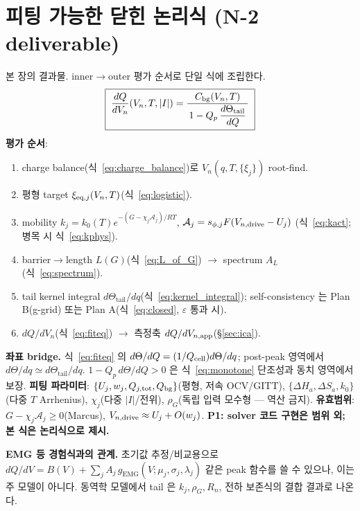 \section{피팅 가능한 닫힌 논리식 (N-2 deliverable)}\label{sec:fiteq}
본 장의 결과물. inner$\to$outer 평가 순서로 단일 식에 조립한다.
\begin{equation}
\boxed{\;\frac{dQ}{dV_n}(V_n,T,|I|)=\frac{C_{\mathrm{bg}}(V_n,T)}{\,1-Q_p\,\dfrac{d\Theta_\mathrm{tail}}{dQ}\,}\;}
\label{eq:fiteq}
\end{equation}
\textbf{평가 순서}:
\begin{enumerate}[label=\textbf{S\arabic*.},leftmargin=2.2em]
\item charge balance(식~\eqref{eq:charge_balance})로 $V_n(q,T,\{\xi_j\})$ root-find.
\item 평형 target $\xi_{\mathrm{eq},j}(V_n,T)$(식~\eqref{eq:logistic}).
\item mobility $k_j=k_0(T)e^{-(G-\chi_j\mathcal A_j)/RT}$, $\mathcal A_j=s_{\phi,j}F(V_{n,\mathrm{drive}}-U_j)$
  (식~\eqref{eq:kact}; 병목 시 식~\eqref{eq:kphys}).
\item barrier$\to$length $L(G)$(식~\eqref{eq:L_of_G}) $\to$ spectrum $A_L$(식~\eqref{eq:spectrum}).
\item tail kernel integral $d\Theta_\mathrm{tail}/dq$(식~\eqref{eq:kernel_integral}); self-consistency 는
  Plan B(g-grid) 또는 Plan A(식~\eqref{eq:closed}, $\varepsilon$ 통과 시).
\item $dQ/dV_n$(식~\eqref{eq:fiteq}) $\to$ 측정축 $dQ/dV_{n,\mathrm{app}}$(\S\ref{sec:ica}).
\end{enumerate}
\textbf{좌표 bridge.} 식~\eqref{eq:fiteq} 의 $d\Theta/dQ=(1/Q_{\mathrm{cell}})d\Theta/dq$; post-peak 영역에서
$d\Theta/dq\simeq d\Theta_\mathrm{tail}/dq$. $1-Q_p\,d\Theta/dQ>0$ 은 식~\eqref{eq:monotone} 단조성과
동치 영역에서 보장.
\textbf{피팅 파라미터}: $\{U_j,w_j,Q_{j,\mathrm{tot}},Q_{\mathrm{bg}}\}$(평형, 저속 OCV/GITT), $\{\Delta H_a,\Delta S_a,k_0\}$
(다중 $T$ Arrhenius), $\chi_j$(다중 $|I|$/전위), $\rho_G$(독립 입력 모수형 — 역산 금지).
\textbf{유효범위}: $G-\chi_j\mathcal A_j\ge0$(Marcus), $V_{n,\mathrm{drive}}\approx U_j+O(w_j)$.
\textbf{P1: solver 코드 구현은 범위 외; 본 식은 논리식으로 제시.}

\textbf{EMG 등 경험식과의 관계.} 초기값 추정/비교용으로
$dQ/dV=B(V)+\sum_j A_j\,g_\mathrm{EMG}(V;\mu_j,\sigma_j,\lambda_j)$ 같은 peak 함수를 쓸 수 있으나, 이는
주 모델이 아니다. 동역학 모델에서 tail 은 $k_j,\rho_G,R_n$, 전하 보존식의 결합 결과로 나온다.

